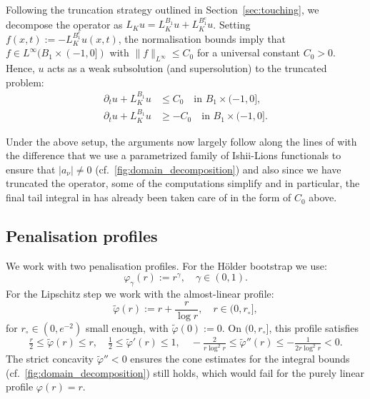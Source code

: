 \documentclass[11pt, a4paper, twoside]{article}
\theoremstyle{definition}
\theoremstyle{remark}
\begin{document}
Following the truncation strategy outlined in Section~\ref{sec:touching}, we decompose the operator as $L_K u = L_K^{B_1} u + L_K^{B_1^c} u$. Setting $f(x,t) := -L_K^{B_1^c} u(x,t)$, the normalisation bounds imply that $f \in L^\infty(B_1 \times (-1,0])$ with $\|f\|_{L^\infty} \le C_0$ for a universal constant $C_0 > 0$. Hence, $u$ acts as a weak subsolution (and supersolution) to the truncated problem:
\begin{align}
  \partial_t u + L_K^{B_1} u &\le C_0 \quad \text{in } B_1 \times (-1,0], \label{eq:trunc-sub} \\
  \partial_t u + L_K^{B_1} u &\ge -C_0 \quad \text{in } B_1 \times (-1,0]. \label{eq:trunc-super}
\end{align}

Under the above setup, the arguments now largely follow along the lines of \cite{BiswasTopp2025} with the difference that
we use a parametrized family of Ishii-Lions functionals to ensure that $|a_{\nu}| \neq 0$ (cf.~\cref{fig:domain_decomposition}) and also since we have truncated the operator, some of the computations simplify and in particular, the final tail integral in \cite{BiswasTopp2025} has already been taken care of in the form of $C_0$ above.  

\subsection*{Penalisation profiles}
We work with two penalisation profiles. For the H\"{o}lder bootstrap we use:
\begin{equation}\label{eq:holder-profile}
  \varphi_\gamma(r) := r^\gamma, \quad \gamma \in (0,1).
\end{equation}
For the Lipschitz step we work with the almost-linear profile:
\begin{equation}\label{eq:lip-profile}
  \tilde\varphi(r) := r + \frac{r}{\log r}, \quad r \in (0, r_\circ],
\end{equation}
for $r_\circ \in (0, e^{-2})$ small enough, with $\tilde\varphi(0) := 0$. On $(0, r_\circ]$, this profile satisfies
\begin{equation}\label{eq:lip-profile-props}
  \tfrac{r}{2} \le \tilde\varphi(r) \le r, \quad
  \tfrac{1}{2} \le \tilde\varphi'(r) \le 1, \quad
  -\tfrac{2}{r\log^2 r} \le \tilde\varphi''(r) \le -\tfrac{1}{2r\log^2 r} < 0.
\end{equation}
The strict concavity $\tilde\varphi'' < 0$ ensures the cone estimates for the integral bounds (cf.~\cref{fig:domain_decomposition}) still holds, which would fail for the purely linear profile $\varphi(r) = r$.
\end{document}
